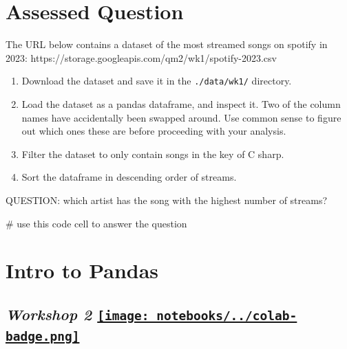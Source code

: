 \documentclass[
  letterpaper,
  DIV=11,
  numbers=noendperiod]{scrreprt}
\newenvironment{Shaded}{\begin{snugshade}}{\end{snugshade}}
\newcommand{\CommentTok}[1]{\textcolor[rgb]{0.37,0.37,0.37}{#1}}
\providecommand{\tightlist}{%
  \setlength{\itemsep}{0pt}\setlength{\parskip}{0pt}}\usepackage{longtable,booktabs,array}
\begin{document}

\hypertarget{assessed-question}{%
\chapter{Assessed Question}\label{assessed-question}}

The URL below contains a dataset of the most streamed songs on spotify
in 2023: https://storage.googleapis.com/qm2/wk1/spotify-2023.csv

\begin{enumerate}
\def\labelenumi{\arabic{enumi}.}
\tightlist
\item
  Download the dataset and save it in the \texttt{./data/wk1/}
  directory.
\item
  Load the dataset as a pandas dataframe, and inspect it. Two of the
  column names have accidentally been swapped around. Use common sense
  to figure out which ones these are before proceeding with your
  analysis.
\item
  Filter the dataset to only contain songs in the key of C sharp.
\item
  Sort the dataframe in descending order of streams.
\end{enumerate}

QUESTION: which artist has the song with the highest number of streams?

\begin{Shaded}
\begin{Highlighting}[]
\CommentTok{\# use this code cell to answer the question}
\end{Highlighting}
\end{Shaded}


\hypertarget{intro-to-pandas}{%
\chapter{Intro to Pandas}\label{intro-to-pandas}}

\hypertarget{workshop-2-open-in-colab}{%
\section[\emph{Workshop 2} ]{\texorpdfstring{\emph{Workshop 2}
\href{https://colab.research.google.com/github/oballinger/QM2/blob/main/notebooks/W02.\%20Pandas.ipynb}{\protect\texttt{[image: notebooks/../colab-badge.png]}}}{Workshop 2 Open In Colab}}\label{workshop-2-open-in-colab}}
\end{document}
